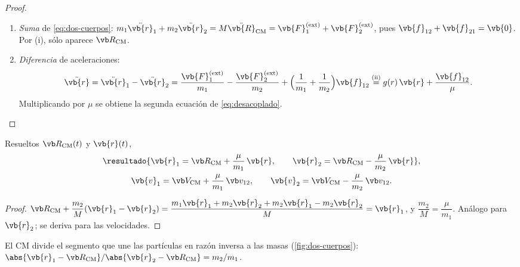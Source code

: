 \begin{proof}
\begin{enumerate}
  \item \emph{Suma} de \eqref{eq:dos-cuerpos}: $m_{1}\ddot{\vb{r}}_{1}+m_{2}\ddot{\vb{r}}_{2}=M\ddot{\vb{R}}\cm=\vb{F}_{1}\ext+\vb{F}_{2}\ext$, pues $\vb{f}_{12}+\vb{f}_{21}=\vb{0}$. Por (i), sólo aparece $\Rcm$.
  \item \emph{Diferencia} de aceleraciones:
  \[
    \ddot{\vb{r}}=\ddot{\vb{r}}_{1}-\ddot{\vb{r}}_{2}
    =\frac{\vb{F}_{1}\ext}{m_{1}}-\frac{\vb{F}_{2}\ext}{m_{2}}
    +\Bigl(\frac1{m_{1}}+\frac1{m_{2}}\Bigr)\vb{f}_{12}
    \overset{\text{(ii)}}{=}g(r)\,\vb{r}+\frac{\vb{f}_{12}}{\mu} .
  \]
  Multiplicando por $\mu$ se obtiene la segunda ecuación de \eqref{eq:desacoplado}.\qedhere
\end{enumerate}
\end{proof}

\begin{proposicion}
\label{prop:posiciones}
Resueltos $\Rcm(t)$ y $\vb{r}(t)$,
\begin{gather}
  \resultado{\vb{r}_{1}=\Rcm+\frac{\mu}{m_{1}}\,\vb{r},\qquad
  \vb{r}_{2}=\Rcm-\frac{\mu}{m_{2}}\,\vb{r}} ,
  \label{eq:posiciones}\\
  \vb{v}_{1}=\Vcm+\frac{\mu}{m_{1}}\,\vrel,\qquad
  \vb{v}_{2}=\Vcm-\frac{\mu}{m_{2}}\,\vrel .\notag
\end{gather}
\end{proposicion}

\begin{proof}
$\Rcm+\dfrac{m_{2}}{M}(\vb{r}_{1}-\vb{r}_{2})=\dfrac{m_{1}\vb{r}_{1}+m_{2}\vb{r}_{2}+m_{2}\vb{r}_{1}-m_{2}\vb{r}_{2}}{M}=\vb{r}_{1}$,
y $\dfrac{m_{2}}{M}=\dfrac{\mu}{m_{1}}$. Análogo para $\vb{r}_{2}$; se deriva para las velocidades.
\end{proof}

El CM divide el segmento que une las partículas en razón inversa a las masas
(\cref{fig:dos-cuerpos}): $\abs{\vb{r}_{1}-\Rcm}/\abs{\vb{r}_{2}-\Rcm}=m_{2}/m_{1}$.

